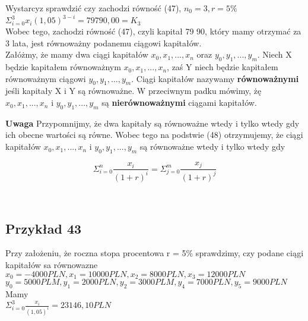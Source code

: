 \documentclass{article}
\begin{document}
Wystarcyz sprawdzić czy zachodzi równość (47), $ n_0 = 3, r = 5\% $\\

$ \Sigma ^3_{i=0} x_i(1,05)^{3-i} = 79 790,00 = K_3 $\\

Wobec tego, zachodzi równość (47), czyli kapitał 79 90, który mamy otrzymać za 3 lata, jest równoważny podanemu ciągowi kapitałów.\\

Załóżmy, że mamy dwa ciągi kapitałów $ x_0, x_1, ..., x_n $ oraz $ y_0, y_1, ..., y_m $. Niech X będzie kapitałem równoważnym $ x_0, x_1, ..., x_n $, zaś Y niech będzie kapitałem równoważnym ciągowi $ y_0, y_1, ..., y_m $. Ciągi kapitałów nazywamy \textbf{równoważnymi} jeśli kapitały X i Y są równoważne. W przeciwnym padku mówimy, żę $ x_0, x_1, ..., x_n $ i $ y_0, y_1, ..., y_m $ są \textbf{nierównoważnymi} ciągami kapitałów.

\textbf{Uwaga} Przypomnijmy, że dwa kapitały są równoważne wtedy i tylko wtedy gdy ich obecne wartości są równe. Wobec tego na podstwie (48) otrzymujemy, że ciągi kapitałów $ x_0, x_1, ..., x_n $ i $ y_0, y_1, ..., y_m $ są równoważne wtedy i tylko wtedy gdy 

\begin{center}
	\begin{equation}
		\Sigma ^n_{i=0}\frac{x_i}{(1 + r)^i} = \Sigma ^m_{j=0}\frac{x_j}{(1 + r)^j}
	\end{equation}
\end{center}\\

\subsection{Przykład 43}

Przy założeniu, że roczna stopa procentowa r = 5\% sprawdzimy, czy podane ciągi kapitałów sa równowazne\\

$ x_0 = -4000 PLN, x_1 = 10000 PLN, x_2=8000 PLN, x_3 = 12000 PLN $\\

$ y_0 = 5000 PLM, y_1 = 2000 PLN, y_2 = 3000 PLM, y_4 = 7000 PLN, y_5 = 9000 PLN $\\

Mamy\\

$ \Sigma ^3_{i=0} \frac{x_i}{(1,05)^i} = 23 146,10 PLN $ \\
\end{document}
